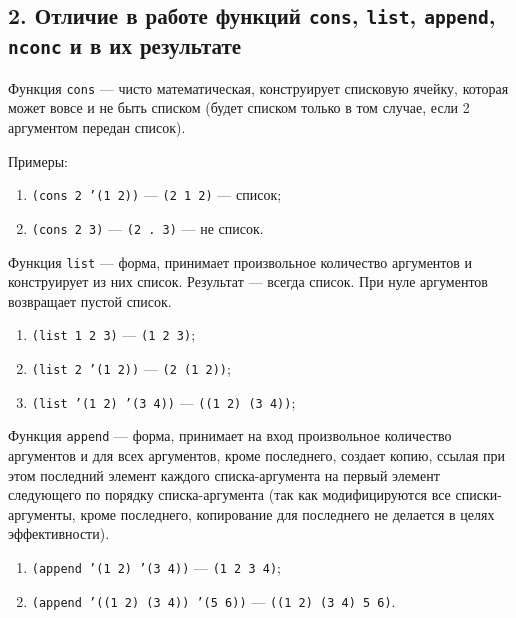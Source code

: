 \subsection*{2. Отличие в работе функций \texttt{cons}, \texttt{list}, \texttt{append}, \texttt{nconc} и в их результате}

Функция \texttt{cons} --- чисто математическая, конструирует списковую ячейку, которая может вовсе и не быть списком (будет списком только в том случае, если 2 аргументом передан список).

Примеры:
\begin{enumerate}
	\item \texttt{(cons 2 '(1 2))} --- \texttt{(2 1 2)} --- список;
	\item \texttt{(cons 2 3)} --- \texttt{(2 . 3)} --- не список.
\end{enumerate}

Функция \texttt{list} --- форма, принимает произвольное количество аргументов и конструирует из них список. Результат --- всегда список. При нуле аргументов возвращает пустой список.

\begin{enumerate}
	\item[] \texttt{(list 1 2 3)} --- \texttt{(1 2 3)};
	\item[] \texttt{(list 2 '(1 2))} --- \texttt{(2 (1 2))};
	\item[] \texttt{(list '(1 2) '(3 4))} --- \texttt{((1 2) (3 4))};
\end{enumerate}

Функция \texttt{append} --- форма, принимает на вход произвольное количество аргументов и для всех аргументов, кроме последнего, создает копию, ссылая при этом последний элемент каждого списка-аргумента на первый элемент следующего по порядку списка-аргумента (так как модифицируются все списки-аргументы, кроме последнего, копирование для последнего не делается в целях эффективности).

\begin{enumerate}
	\item[] \texttt{(append '(1 2) '(3 4))} --- \texttt{(1 2 3 4)};
	\item[] \texttt{(append '((1 2) (3 4)) '(5 6))} --- \texttt{((1 2) (3 4) 5 6)}.
\end{enumerate}
